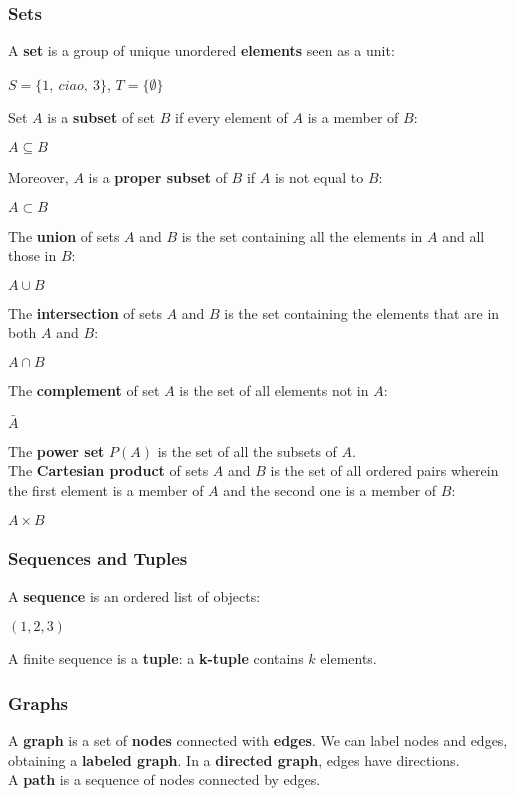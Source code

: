 \documentclass{article}
\begin{document}
\subsubsection{Sets}
A \textbf{set} is a group of unique unordered \textbf{elements} seen as a unit:
\begin{center}
    $S = \{1, \ ciao, \ 3\}$, $T = \{\emptyset\}$
\end{center}
Set $A$ is a \textbf{subset} of set $B$ if every element of $A$ is a member of $B$:
\begin{center}
    $A \subseteq B$
\end{center}
Moreover, $A$ is a \textbf{proper subset} of $B$ if $A$ is not equal to $B$:
\begin{center}
    $A \subset B$
\end{center}
The \textbf{union} of sets $A$ and $B$ is the set containing all the elements in $A$ and all those in $B$:
\begin{center}
    $A \cup B$
\end{center}
The \textbf{intersection} of sets $A$ and $B$ is the set containing the elements that are in both $A$ and $B$:
\begin{center}
    $A \cap B$
\end{center}
\noindent
The \textbf{complement} of set $A$ is the set of all elements not in $A$:
\begin{center}
    $\bar{A}$
\end{center}
The \textbf{power set} $P(A)$ is the set of all the subsets of $A$. \\
The \textbf{Cartesian product} of sets $A$ and $B$ is the set of all ordered pairs wherein the first element is a member of $A$ and the second one is a member of $B$:
\begin{center}
    $A \times B$
\end{center}
\subsubsection{Sequences and Tuples}
A \textbf{sequence} is an ordered list of objects:
\begin{center}
    $(1, 2, 3)$
\end{center}
A finite sequence is a \textbf{tuple}: a \textbf{k-tuple} contains $k$ elements.
\subsubsection{Graphs}
A \textbf{graph} is a set of \textbf{nodes} connected with \textbf{edges}. We can label nodes and edges, obtaining a \textbf{labeled graph}. In a \textbf{directed graph}, edges have directions. \\
A \textbf{path} is a sequence of nodes connected by edges.
\end{document}
